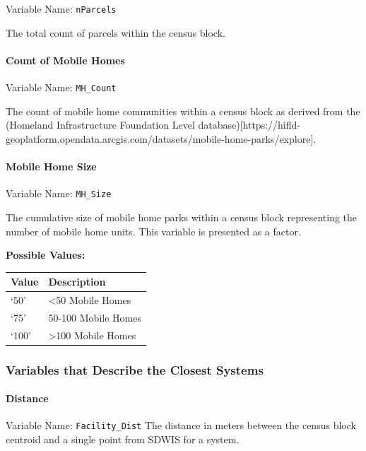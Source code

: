 \documentclass[
  letterpaper,
  DIV=11,
  numbers=noendperiod,
  oneside]{scrartcl}
\let\oldparagraph\paragraph
\renewcommand{\paragraph}[1]{\oldparagraph{#1}\mbox{}}
\begin{document}
Variable Name: \texttt{nParcels}

The total count of parcels within the census block.

\paragraph{Count of Mobile Homes}\label{count-of-mobile-homes}

Variable Name: \texttt{MH\_Count}

The count of mobile home communities within a census block as derived
from the (Homeland Infrastructure Foundation Level
database){[}https://hifld-geoplatform.opendata.arcgis.com/datasets/mobile-home-parks/explore{]}.

\paragraph{Mobile Home Size}\label{mobile-home-size}

Variable Name: \texttt{MH\_Size}

The cumulative size of mobile home parks within a census block
representing the number of mobile home units. This variable is presented
as a factor.

\textbf{Possible Values:}

\begin{longtable}[]{@{}ll@{}}
\toprule\noalign{}
Value & Description \\
\midrule\noalign{}
\endhead
\bottomrule\noalign{}
\endlastfoot
`50' & \textless50 Mobile Homes \\
`75' & 50-100 Mobile Homes \\
`100' & \textgreater100 Mobile Homes \\
\end{longtable}

\subsubsection{Variables that Describe the Closest
Systems}\label{variables-that-describe-the-closest-systems}

\paragraph{Distance}\label{distance}

Variable Name: \texttt{Facility\_Dist} The distance in meters between
the census block centroid and a single point from SDWIS for a system.
\end{document}

